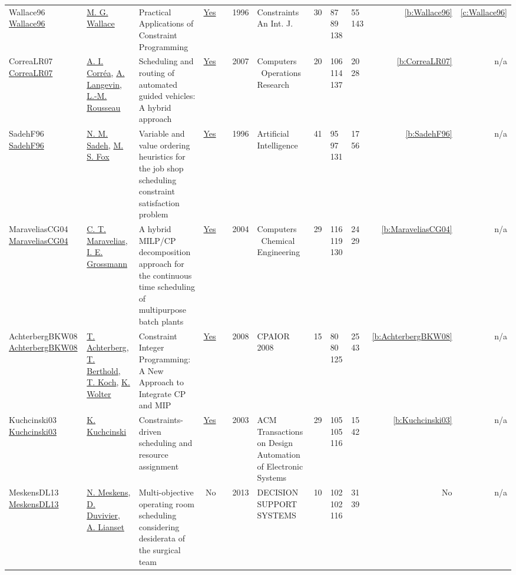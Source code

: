 {\begin{longtable}{>{\raggedright\arraybackslash}p{3cm}>{\raggedright\arraybackslash}p{4.5cm}>{\raggedright\arraybackslash}p{6.0cm}rrrp{2.5cm}rp{1cm}p{1cm}rr}
Wallace96 \href{https://doi.org/10.1007/BF00143881}{Wallace96} & \hyperref[auth:a117]{M. G. Wallace} & Practical Applications of Constraint Programming & \href{../works/Wallace96.pdf}{Yes} & \cite{Wallace96} & 1996 & Constraints An Int. J. & 30 & 87 89 138 & 55 143 & \ref{b:Wallace96} & \ref{c:Wallace96}\\
CorreaLR07 \href{http://dx.doi.org/10.1016/j.cor.2005.07.004}{CorreaLR07} & \hyperref[auth:a949]{A. I. Corr{\'{e}}a}, \hyperref[auth:a645]{A. Langevin}, \hyperref[auth:a326]{L.-M. Rousseau} & Scheduling and routing of automated guided vehicles: A hybrid approach & \href{../works/CorreaLR07.pdf}{Yes} & \cite{CorreaLR07} & 2007 & Computers \  Operations Research & 20 & 106 114 137 & 20 28 & \ref{b:CorreaLR07} & n/a\\
SadehF96 \href{http://dx.doi.org/10.1016/0004-3702(95)00098-4}{SadehF96} & \hyperref[auth:a1044]{N. M. Sadeh}, \hyperref[auth:a302]{M. S. Fox} & \cellcolor{gold!20}Variable and value ordering heuristics for the job shop scheduling constraint satisfaction problem & \href{../works/SadehF96.pdf}{Yes} & \cite{SadehF96} & 1996 & Artificial Intelligence & 41 & 95 97 131 & 17 56 & \ref{b:SadehF96} & n/a\\
MaraveliasCG04 \href{http://dx.doi.org/10.1016/j.compchemeng.2004.03.016}{MaraveliasCG04} & \hyperref[auth:a381]{C. T. Maravelias}, \hyperref[auth:a382]{I. E. Grossmann} & A hybrid MILP/CP decomposition approach for the continuous time scheduling of multipurpose batch plants & \href{../works/MaraveliasCG04.pdf}{Yes} & \cite{MaraveliasCG04} & 2004 & Computers \  Chemical Engineering & 29 & 116 119 130 & 24 29 & \ref{b:MaraveliasCG04} & n/a\\
AchterbergBKW08 \href{https://doi.org/10.1007/978-3-540-68155-7_4}{AchterbergBKW08} & \hyperref[auth:a1045]{T. Achterberg}, \hyperref[auth:a351]{T. Berthold}, \hyperref[auth:a1168]{T. Koch}, \hyperref[auth:a1169]{K. Wolter} & Constraint Integer Programming: {A} New Approach to Integrate {CP} and {MIP} & \href{../works/AchterbergBKW08.pdf}{Yes} & \cite{AchterbergBKW08} & 2008 & CPAIOR 2008 & 15 & 80 80 125 & 25 43 & \ref{b:AchterbergBKW08} & n/a\\
Kuchcinski03 \href{http://dx.doi.org/10.1145/785411.785416}{Kuchcinski03} & \hyperref[auth:a660]{K. Kuchcinski} & Constraints-driven scheduling and resource assignment & \href{../works/Kuchcinski03.pdf}{Yes} & \cite{Kuchcinski03} & 2003 & ACM Transactions on Design Automation of Electronic Systems & 29 & 105 105 116 & 15 42 & \ref{b:Kuchcinski03} & n/a\\
MeskensDL13 \href{http://dx.doi.org/10.1016/j.dss.2012.10.019}{MeskensDL13} & \hyperref[auth:a597]{N. Meskens}, \hyperref[auth:a598]{D. Duvivier}, \hyperref[auth:a1461]{A. Lianset} & Multi-objective operating room scheduling considering desiderata of the surgical team & No & \cite{MeskensDL13} & 2013 & DECISION SUPPORT SYSTEMS & 10 & 102 102 116 & 31 39 & No & n/a\\
\end{longtable}
}

